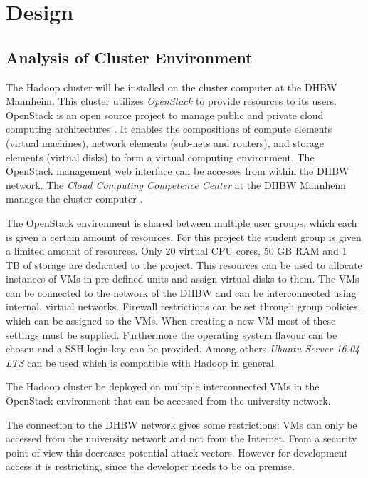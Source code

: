 \chapter{Design}
\label{chap:design}

\section{Analysis of Cluster Environment}

The Hadoop cluster will be installed on the cluster computer at the \ac{DHBW} Mannheim.
This cluster utilizes \emph{OpenStack} to provide resources to its users. 
OpenStack is an open source project to manage public and private cloud computing architectures \autocite[][]{openstack}. 
It enables the compositions of compute elements (virtual machines), network elements (sub-nets and routers), 
and storage elements (virtual disks) to form a virtual computing environment.
The OpenStack management web interface can be accesses from within the \ac{DHBW} network. 
The \emph{Cloud Computing Competence Center} at the \ac{DHBW} Mannheim  manages the cluster computer \autocite[][]{dhbwmannheim2018c4}.

The OpenStack environment is shared between multiple user groups, 
which each is given a certain amount of resources. 
For this project the student group is given a limited amount of resources.
Only 20 virtual \ac{CPU} cores, 50 \ac{GB} \ac{RAM} and 1 \ac{TB} of storage are dedicated to the project.
This resources can be used to allocate instances of \acp{VM} in pre-defined units and assign virtual disks to them.
The \acp{VM} can be connected to the network of the \ac{DHBW} and can be interconnected using internal, virtual networks.
Firewall restrictions can be set through group policies, which can be assigned to the \acp{VM}. 
When creating a new \ac{VM} most of these settings must be supplied. 
Furthermore the operating system flavour can be chosen and a \ac{SSH} login key can be provided.
Among others \emph{Ubuntu Server 16.04 LTS} can be used which is compatible with Hadoop in general.

The Hadoop cluster be deployed on multiple interconnected \acp{VM} in the OpenStack environment that can be accessed from the university network.

The connection to the \ac{DHBW} network gives some restrictions: \acp{VM} can only be accessed from the university network and not from the Internet.
From a security point of view this decreases potential attack vectors.
However for development access it is restricting, 
since the developer needs to be on premise. 

